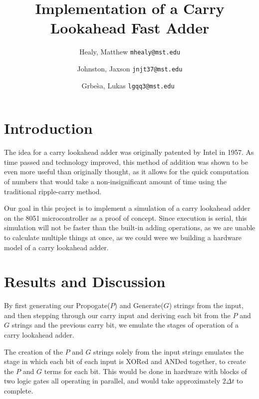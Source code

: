 \documentclass[journal]{IEEEtran}
\begin{document}
\title{Implementation of a Carry Lookahead Fast Adder}
\author{
	Healy, Matthew
	\texttt{mhealy@mst.edu}\\
	\and
	Johnston, Jaxson
	\texttt{jnjt37@mst.edu}\\
	\and
	Grbe\`sa, Lukas
	\texttt{lgqq3@mst.edu}\
}

\maketitle


\begin{abstract}

\end{abstract}

\section{Introduction}\label{sec:intro}
The idea for a carry lookahead adder was originally patented by Intel in 1957.
As time passed and technology improved, this method of addition was shown
to be even more useful than originally thought, as it allows for the quick
computation of numbers that would take a non-insignificant amount of time
using the traditional ripple-carry method.

Our goal in this project is to implement a simulation of a carry lookahead
adder on the 8051 microcontroller as a proof of concept. Since execution is
serial, this simulation will not be faster than the built-in adding operations,
as we are unable to calculate multiple things at once, as we could were we
building a hardware model of a carry lookahead adder.

\section{Results and Discussion}\label{sec:discuss}

By first generating our Propogate($P$) and Generate($G$) strings from the input,
and then stepping through our carry input and deriving each bit from the
$P$ and $G$ strings and the previous carry bit, we emulate the stages of
operation of a carry lookahead adder.

The creation of the $P$ and $G$ strings solely from the input strings emulates
the stage in which each bit of each input is XORed and ANDed together, to create
the $P$ and $G$ terms for each bit. This would be done in hardware with blocks
of two logic gates all operating in parallel, and would take approximately
$2\Delta t$ to complete.
\end{document}
